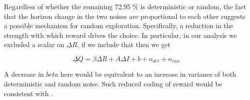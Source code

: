 \documentclass[12pt]{article}
\begin{document}
			
	
	Regardless of whether the remaining 72.95 \% is deterministic or random, the fact that the horizon change in the two noises are proportional to each other suggests a possible mechanism for random exploration. Specifically, a reduction in the strength with which reward drives the choice. In particular, in our analysis we excluded a scalar on $\Delta R$, if we include that then we get
	
	\begin{equation}
	    \Delta Q = \beta \Delta R + A \Delta I + b + n_{det} + n_{ran}
	\end{equation}
	
	A decrease in $beta$ here would be equivalent to an increase in variance of both deterministic and random noise. Such reduced coding of reward would be consistent with \cite{ebitz17}.
	
	
	
	
	
	
	
	
	
	\cleardoublepage
	\ifdefined{}
	\else
	\fi
	
\end{document}
